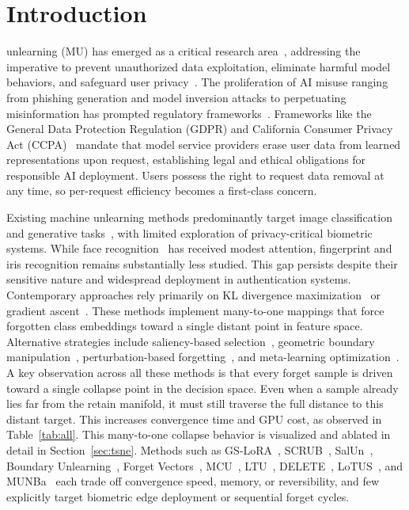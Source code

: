 \section{Introduction}
 unlearning (MU) has emerged as a critical research area~\cite{hou2025fixguard,ye2023stealthy}, addressing the imperative to prevent unauthorized data exploitation, eliminate harmful model behaviors, and safeguard user privacy~\cite{zhu2024privauditor}. The proliferation of AI misuse ranging from phishing generation and model inversion attacks to perpetuating misinformation has prompted regulatory frameworks~\cite{li2024model,prabhakar2025model,kahla2022label}. Frameworks like the General Data Protection Regulation (GDPR) and California Consumer Privacy Act (CCPA)~\cite{goldman2020introduction,data2018general} mandate that model service providers erase user data from learned representations upon request, establishing legal and ethical obligations for responsible AI deployment. Users possess the right to request data removal at any time, so per-request efficiency becomes a first-class concern.


Existing machine unlearning methods predominantly target image classification~\cite{wuerkaixi2025accurate} and generative tasks~\cite{wei2025emma}, with limited exploration of privacy-critical biometric systems. While face recognition~\cite{de2024unlearning,zakharov2026face,shivam2025cure} has received modest attention, fingerprint and iris recognition remains substantially less studied. This gap persists despite their sensitive nature and widespread deployment in authentication systems. Contemporary approaches rely primarily on KL divergence maximization~\cite{kurmanji2023towards} or gradient ascent~\cite{zhao2024continual}. These methods implement many-to-one mappings that force forgotten class embeddings toward a single distant point in feature space. Alternative strategies include saliency-based selection~\cite{fan2023salun}, geometric boundary manipulation~\cite{chen2023boundary}, perturbation-based forgetting~\cite{sun2024forget}, and meta-learning optimization~\cite{huang2024learning,shi2025mcu}. A key observation across all these methods is that every forget sample is driven toward a single collapse point in the decision space. Even when a sample already lies far from the retain manifold, it must still traverse the full distance to this distant target. This increases convergence time and GPU cost, as observed in Table~\ref{tab:all}. This many-to-one collapse behavior is visualized and ablated in detail in Section~\ref{sec:tsne}. Methods such as GS-LoRA~\cite{zhao2024continual}, SCRUB~\cite{kurmanji2023towards}, SalUn~\cite{fan2023salun}, Boundary Unlearning~\cite{chen2023boundary}, Forget Vectors~\cite{sun2024forget}, MCU~\cite{shi2025mcu}, LTU~\cite{huang2024learning}, DELETE~\cite{zhou2025decoupled}, LoTUS~\cite{spartalis2025lotus}, and MUNBa~\cite{wu2025munba} each trade off convergence speed, memory, or reversibility, and few explicitly target biometric edge deployment or sequential forget cycles.


